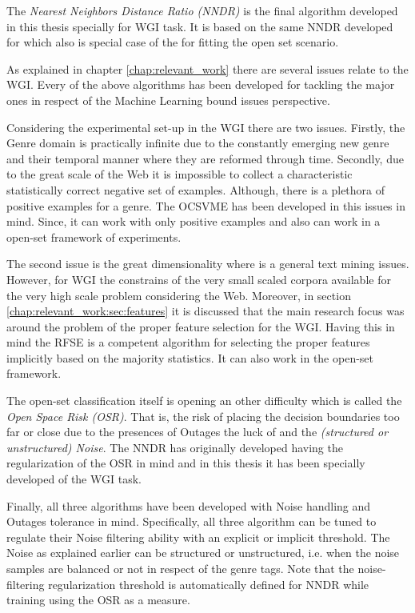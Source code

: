 The \textit{Nearest Neighbors Distance Ratio (NNDR)} is the final algorithm developed in this thesis specially for WGI task. It is based on the same NNDR developed for \parencite{} which also is special case of the  for fitting the open set scenario. 

As explained in chapter \ref{chap:relevant_work} there are several issues relate to the WGI. Every of the above algorithms has been developed for tackling the major ones in respect of the Machine Learning bound issues perspective. 

Considering the experimental set-up in the WGI there are two issues. Firstly, the Genre domain is practically infinite due to the constantly emerging new genre and their temporal manner where they are reformed through time. Secondly, due to the great scale of the Web it is impossible to collect a characteristic statistically correct negative set of examples. Although, there is a plethora of positive examples for a genre. The OCSVME has been developed in this issues in mind. Since, it can work with only positive examples and also can work in a open-set framework of experiments.

The second issue is the great dimensionality where is a general text mining issues. However, for WGI the constrains of the very small scaled corpora available for the very high scale problem considering the Web. Moreover, in section \ref{chap:relevant_work:sec:features} it is discussed that the main research focus was around the problem of the proper feature selection for the WGI. Having this in mind the RFSE is a competent algorithm for selecting the proper features implicitly based on the majority statistics. It can also work in the open-set framework.

The open-set classification itself is opening an other difficulty which is called the \textit{Open Space Risk (OSR)}. That is, the risk of placing the decision boundaries too far or close due to the presences of Outages the luck of  and the \textit{(structured or unstructured) Noise}. The NNDR has originally developed having the regularization of the OSR in mind and in this thesis it has been specially developed of the WGI task.

Finally, all three algorithms have been developed with Noise handling and Outages tolerance in mind. Specifically, all three algorithm can be tuned to regulate their Noise filtering ability with an explicit or implicit threshold. The Noise as explained earlier can be structured or unstructured, i.e. when the noise samples are balanced or not in respect of the genre tags. Note that the noise-filtering regularization threshold is automatically defined for NNDR while training using the OSR as a measure.


